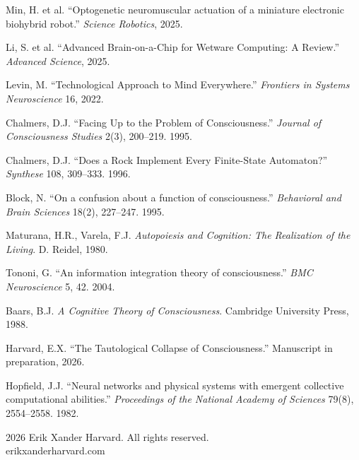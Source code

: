 \documentclass[12pt, letterpaper]{article}
\begin{document}
\begin{enumerate}[label={[\arabic*]}, nosep, leftmargin=2em]
\item Min, H. et al. ``Optogenetic neuromuscular actuation of a miniature electronic biohybrid robot.'' \textit{Science Robotics}, 2025.

\item Li, S. et al. ``Advanced Brain-on-a-Chip for Wetware Computing: A Review.'' \textit{Advanced Science}, 2025.

\item Levin, M. ``Technological Approach to Mind Everywhere.'' \textit{Frontiers in Systems Neuroscience} 16, 2022.

\item Chalmers, D.J. ``Facing Up to the Problem of Consciousness.'' \textit{Journal of Consciousness Studies} 2(3), 200--219. 1995.

\item Chalmers, D.J. ``Does a Rock Implement Every Finite-State Automaton?'' \textit{Synthese} 108, 309--333. 1996.

\item Block, N. ``On a confusion about a function of consciousness.'' \textit{Behavioral and Brain Sciences} 18(2), 227--247. 1995.

\item Maturana, H.R., Varela, F.J. \textit{Autopoiesis and Cognition: The Realization of the Living}. D. Reidel, 1980.

\item Tononi, G. ``An information integration theory of consciousness.'' \textit{BMC Neuroscience} 5, 42. 2004.

\item Baars, B.J. \textit{A Cognitive Theory of Consciousness}. Cambridge University Press, 1988.

\item Harvard, E.X. ``The Tautological Collapse of Consciousness.'' Manuscript in preparation, 2026.

\item Hopfield, J.J. ``Neural networks and physical systems with emergent collective computational abilities.'' \textit{Proceedings of the National Academy of Sciences} 79(8), 2554--2558. 1982.

\end{enumerate}

\vspace{2em}
\begin{center}
{\small \textcopyright{} 2026 Erik Xander Harvard. All rights reserved.\\
erikxanderharvard.com}
\end{center}
\end{document}
